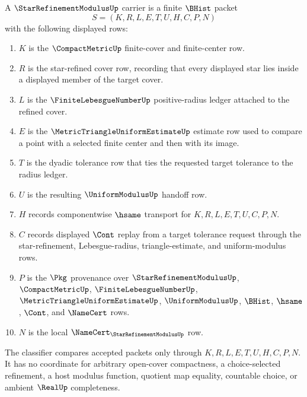 \begin{definition}\label{def:star-refinement-modulus-carrier}
A $\StarRefinementModulusUp$ carrier is a finite $\BHist$ packet
$$
S=(K,R,L,E,T,U,H,C,P,N)
$$
with the following displayed rows:
\begin{enumerate}
\item $K$ is the $\CompactMetricUp$ finite-cover and finite-center row.
\item $R$ is the star-refined cover row, recording that every displayed star lies inside a displayed member of the target cover.
\item $L$ is the $\FiniteLebesgueNumberUp$ positive-radius ledger attached to the refined cover.
\item $E$ is the $\MetricTriangleUniformEstimateUp$ estimate row used to compare a point with a selected finite center and then with its image.
\item $T$ is the dyadic tolerance row that ties the requested target tolerance to the radius ledger.
\item $U$ is the resulting $\UniformModulusUp$ handoff row.
\item $H$ records componentwise $\hsame$ transport for $K,R,L,E,T,U,C,P,N$.
\item $C$ records displayed $\Cont$ replay from a target tolerance request through the star-refinement, Lebesgue-radius, triangle-estimate, and uniform-modulus rows.
\item $P$ is the $\Pkg$ provenance over $\StarRefinementModulusUp$, $\CompactMetricUp$, $\FiniteLebesgueNumberUp$, $\MetricTriangleUniformEstimateUp$, $\UniformModulusUp$, $\BHist$, $\hsame$, $\Cont$, and $\NameCert$ rows.
\item $N$ is the local $\NameCert_{\StarRefinementModulusUp}$ row.
\end{enumerate}
The classifier compares accepted packets only through $K,R,L,E,T,U,H,C,P,N$. It has no coordinate for arbitrary open-cover compactness, a choice-selected refinement, a host modulus function, quotient map equality, countable choice, or ambient $\RealUp$ completeness.
\end{definition}

